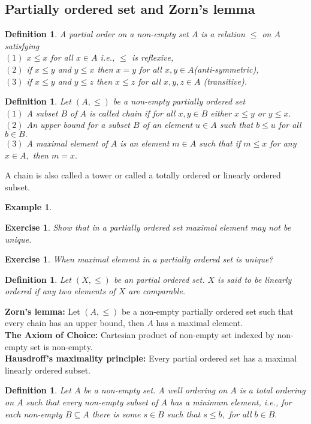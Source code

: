 \documentclass[11pt]{amsart}
\newtheorem{defn}[theorem]{Definition}
\newtheorem{ex}[theorem]{Exercise}
\newtheorem{eg}[theorem]{Example}
\begin{document}
\subsection{Partially ordered set and Zorn's lemma}
\begin{defn}
A partial order on a non-empty set $A$ is a relation $\leq$ on $A$ satisfying\\
$(1)$ $x\leq x$ for all $x\in A$ i.e., $\leq$ is reflexive,\\
$(2)$ if $x\leq y$ and $y\leq x$ then $x=y$ for all $x,y\in A$(anti-symmetric),\\
$(3)$ if $x\leq y$ and $y\leq z$ then $x\leq z$ for all $x,y,z\in A$ (transitive).
\end{defn}
\begin{defn}
Let $(A,\leq )$ be a non-empty partially ordered set\\
$(1)$ A subset $B$ of $A$ is called chain if for all $x,y\in B$ either $x\leq y$ or $y\leq x.$\\
$(2)$ An upper bound for a subset $B$ of an element $u\in A$ such that $b\leq u$ for all $b\in B.$\\
$(3)$ A maximal element of $A$ is an element $m\in A$ such that if $m\leq x$ for any $x\in A,$ then $m=x.$ 
\end{defn}
A chain is also called a tower or called a totally ordered or linearly ordered subset.
\begin{eg}

\end{eg}
\begin{ex}
Show that in a partially ordered set maximal element may not be unique.
\end{ex}
\begin{ex}
When maximal element in a partially ordered set is unique?
\end{ex}
\begin{defn}
Let $(X,\leq)$ be an partial ordered set. $X$ is said to be linearly ordered if any two elements of $X$ are comparable.
\end{defn}
\textbf{Zorn's lemma:} Let $(A,\leq )$ be a non-empty partially ordered set such that every chain has an upper bound, then $A$ has a maximal element.\\
\textbf{The Axiom of Choice:} Cartesian product of non-empty set indexed by non-empty set is non-empty.\\
\textbf{Hausdroff's maximality principle:} Every partial ordered set has a maximal linearly ordered subset.
\begin{defn}
Let $A$ be a non-empty set. A well ordering on $A$ is a total ordering on $A$ such that every non-empty subset of $A$ has a minimum element, i.e., for each non-empty $B\subseteq A$ there is some $s\in B$ such that $s\leq b,$ for all $b\in B.$
\end{defn}
\end{document}
